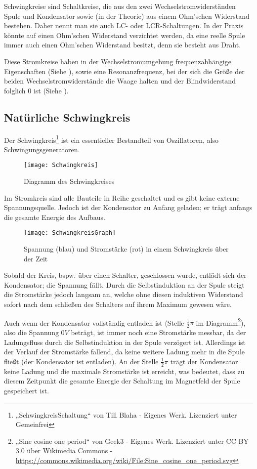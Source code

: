 
Schwingkreise sind Schaltkreise, die aus den zwei Wechselstromwiderständen Spule und Kondensator sowie (in der Theorie) aus einem Ohm'schen Widerstand bestehen. Daher nennt man sie auch LC- oder LCR-Schaltungen. In der Praxis könnte auf einen Ohm'schen Widerstand verzichtet werden, da eine reelle Spule immer auch einen Ohm'schen Widerstand besitzt, denn sie besteht aus Draht. 

Diese Stromkreise haben in der Wechselstromumgebung frequenzabhängige Eigenschaften (Siehe ), sowie eine Resonanzfrequenz, bei der sich die Größe der beiden Wechselstromwiderstände die Waage halten und der Blindwiderstand folglich $0$ ist (Siehe ).

\subsection{Natürliche Schwingkreis}

Der Schwingkreis\footnote{„SchwingkreisSchaltung“ von Till Blaha - Eigenes Werk. Lizenziert unter Gemeinfrei} ist ein essentieller Bestandteil von Oszillatoren, also Schwingungsgeneratoren. 

\begin{figure}[h!]
	\centering
	\texttt{[image: Schwingkreis]}
	\caption{Diagramm des Schwingkreises}
\end{figure}

Im Stromkreis sind alle Bauteile in Reihe geschaltet und es gibt keine externe Spannungsquelle. Jedoch ist der Kondensator zu Anfang geladen; er trägt anfangs die gesamte Energie des Aufbaus.

\begin{figure}[h!]
	\centering
	\texttt{[image: SchwingkreisGraph]}
	\caption{Spannung (blau) und Stromstärke (rot) in einem Schwingkreis über der Zeit}
\end{figure}

Sobald der Kreis, bspw. über einen Schalter, geschlossen wurde, entlädt sich der Kondensator; die Spannung fällt. Durch die Selbstinduktion an der Spule steigt die Stromstärke jedoch langsam an, welche ohne diesen induktiven Widerstand sofort nach dem schließen des Schalters auf ihrem Maximum gewesen wäre.

Auch wenn der Kondensator vollständig entladen ist (Stelle $\frac{1}{2}\pi$ im Diagramm\footnote{„Sine cosine one period“ von Geek3 - Eigenes Werk. Lizenziert unter CC BY 3.0 über Wikimedia Commons - \url{https://commons.wikimedia.org/wiki/File:Sine_cosine_one_period.svg}}), also die Spannung $0V$ beträgt, ist immer noch eine Stromstärke messbar, da der Ladungsfluss durch die Selbstinduktion in der Spule verzögert ist. Allerdings ist der Verlauf der Stromstärke fallend, da keine weitere Ladung mehr in die Spule fließt (der Kondensator ist entladen). An der Stelle $\frac{1}{2}\pi$ trägt der Kondensator keine Ladung und die maximale Stromstärke ist erreicht, was bedeutet, dass zu diesem Zeitpunkt die gesamte Energie der Schaltung im Magnetfeld der Spule gespeichert ist.

